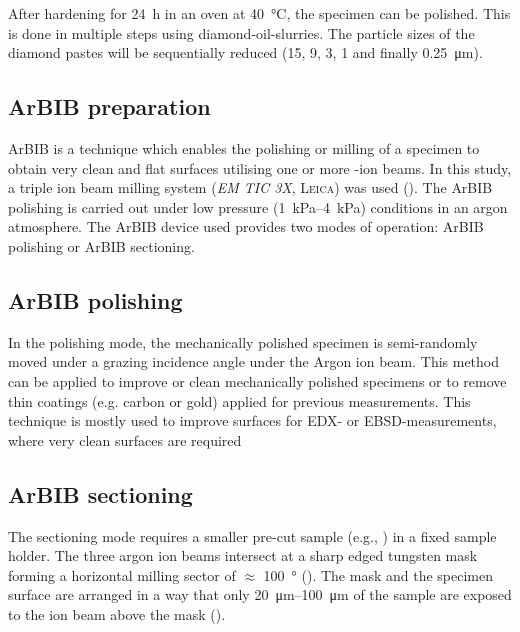 After hardening for \qty{24}{\hour} in an oven at \qty{40}{\celsius}, the specimen can be polished.
This is done in multiple steps using diamond-oil-slurries.
The particle sizes of the diamond pastes will be sequentially reduced (\num{15}, \num{9}, \num{3}, \num{1} and finally \qty{0.25}{\micro\meter}).

\subsection{\Acl*{ArBIB} preparation}

\ac{ArBIB} is a technique which enables the polishing or milling of a specimen to obtain very clean and flat surfaces utilising one or more -ion beams.
In this study, a triple ion beam milling system (\textit{EM TIC 3X}, \textsc{Leica}) was used ().
The \ac{ArBIB} polishing is carried out under low pressure (\qtyrange{1}{4}{\kilo\pascal}) conditions in an argon atmosphere.
The \ac{ArBIB} device used provides two modes of operation: \ac{ArBIB} polishing or \ac{ArBIB} sectioning.

\subsection{\acs*{ArBIB} polishing}
\label{sec:bib_pol_moving}

In the polishing mode, the mechanically polished specimen is semi-randomly moved under a grazing incidence angle under the Argon ion beam.
This method can be applied to improve or clean mechanically polished specimens or to remove thin coatings (e.g. carbon or gold) applied for previous measurements.
This technique is mostly used to improve surfaces for \ac{EDX}- or \ac{EBSD}-measurements, where very clean surfaces are required \cite{rossler.2017,rossler.2022}

\subsection{\acs*{ArBIB} sectioning}
\label{sec:bib_pol_fixed}

The sectioning mode requires a smaller pre-cut sample (e.g., ) in a fixed sample holder.
The three argon ion beams intersect at a sharp edged tungsten mask forming a horizontal milling sector of $\approx$ \qty{100}{\degree} ().
The mask and the specimen surface are arranged in a way that only \qtyrange{20}{100}{\micro\meter} of the sample are exposed to the ion beam above the mask ().

